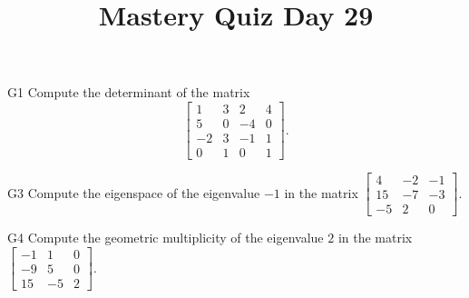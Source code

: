 \documentclass{sbgLAquiz}
\title{Mastery Quiz Day 29 }
\begin{document}
\begin{problem}{G1}
Compute the determinant of the matrix
\[
  \begin{bmatrix}
    1 & 3 & 2 & 4 \\
    5 & 0 & -4 & 0 \\
    -2 & 3 & -1 & 1 \\
    0 & 1 & 0 & 1
  \end{bmatrix}
.\]
\end{problem}

\begin{problem}{G3}
Compute the eigenspace of the eigenvalue $-1$ in the matrix $\begin{bmatrix} 4 & -2 & -1 \\ 15 & -7 & -3 \\ -5 & 2 & 0 \end{bmatrix}$.
\end{problem}
\newpage

\begin{problem}{G4}
Compute the geometric multiplicity of the eigenvalue $2$ in the matrix $\begin{bmatrix} -1 & 1 & 0 \\ -9 & 5 & 0 \\ 15 & -5 & 2 \end{bmatrix}$.
\end{problem}
\end{document}
